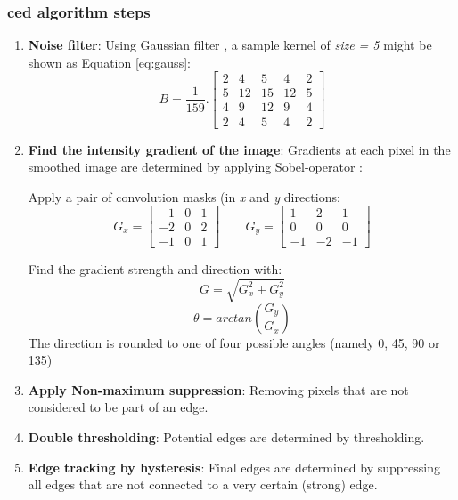 \subsubsection{\acrshort{ced} algorithm steps}
\label{sec:ced_step}
\begin{enumerate}
	\item \textbf{Noise filter}: Using Gaussian filter \nocite{gauss_filter}, a sample kernel of \textit{size = 5} might be shown as Equation \ref{eq:gauss}:
	\begin{equation}
		\label{eq:gauss}
		B = \frac{1}{159} .
		\left[ \begin{array}{ccccc}
		2 & 4 & 5 & 4 & 2 \\
		5 & 12 & 15 & 12 & 5 \\
		4 & 9 & 12 & 9 & 4 \\
		2 & 4 & 5 & 4 & 2
		\end{array} \right]
	\end{equation}

	\item \textbf{Find the intensity gradient of the image}: Gradients at each pixel in the smoothed image are determined by applying Sobel-operator \cite{sobel_alg}:

	Apply a pair of convolution masks (in \textit{x} and \textit{y} directions:
	\begin{equation}
		\label{eq:gx_gy}
		G_x =
		\left[ \begin{array}{ccc}
		-1 & 0 & 1 \\
		-2 & 0 & 2 \\
		-1 & 0 & 1
		\end{array} \right]
		\qquad
		G_y =
		\left[ \begin{array}{ccc}
		1 & 2 & 1 \\
		0 & 0 & 0 \\
		-1 & -2 & -1
		\end{array} \right]
	\end{equation}

	Find the gradient strength and direction with:
	\begin{equation}
		\label{eq:gradient}
		G = \sqrt{G^2_x + G^2_y}
	\end{equation}
	\begin{equation}
		\label{eq:direction}
		\theta = arctan(\frac{G_y}{G_x})
	\end{equation}
	The direction is rounded to one of four possible angles (namely 0, 45, 90 or 135)

	\item \textbf{Apply Non-maximum suppression}: Removing pixels that are not considered to be part of an edge.
	\item \textbf{Double thresholding}: Potential edges are determined by thresholding.
	\item \textbf{Edge tracking by hysteresis}: Final edges are determined by suppressing all edges that are not connected to a very certain (strong) edge.
\end{enumerate}

